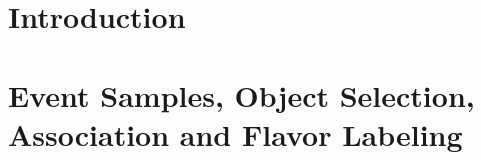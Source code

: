 \documentclass[USenglish,texlive=2013]{\ATLASLATEXPATH atlasdoc}
\begin{document}
\maketitle

\setcounter{secnumdepth}{0}
%

\setcounter{secnumdepth}{5}
\setcounter{tocdepth}{5}

\clearpage

\tableofcontents
\clearpage

\listoftodos

\section{Introduction}



%


\section{Event Samples, Object Selection, Association and Flavor Labeling}
\label{sec:samples}



%
\end{document}
